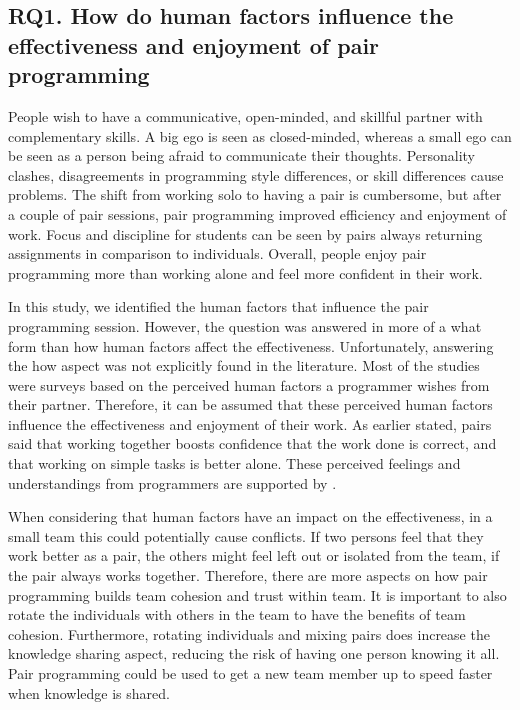 \documentclass[conference]{IEEEtran}
\begin{document}
\subsection{RQ1. How do human factors influence the effectiveness and enjoyment of pair programming}
    
People wish to have a communicative, open-minded, and skillful partner with complementary skills. A big ego is seen as closed-minded, whereas a small ego can be seen as a person being afraid to communicate their thoughts. Personality clashes, disagreements in programming style differences, or skill differences cause problems. The shift from working solo to having a pair is cumbersome, but after a couple of pair sessions, pair programming improved efficiency and enjoyment of work. Focus and discipline for students can be seen by pairs always returning assignments in comparison to individuals. Overall, people enjoy pair programming more than working alone and feel more confident in their work.

In this study, we identified the human factors that influence the pair programming session. However, the question was answered in more of a what form than how human factors affect the effectiveness. Unfortunately, answering the how aspect was not explicitly found in the literature. Most of the studies were surveys based on the perceived human factors a programmer wishes from their partner. Therefore, it can be assumed that these perceived human factors influence the effectiveness and enjoyment of their work. As earlier stated, pairs said that working together boosts confidence that the work done is correct, and that working on simple tasks is better alone. These perceived feelings and understandings from programmers are supported by \cite{Arisholm2007Evaluating}.

When considering that human factors have an impact on the effectiveness, in a small team this could potentially cause conflicts. If two persons feel that they work better as a pair, the others might feel left out or isolated from the team, if the pair always works together. Therefore, there are more aspects on how pair programming builds team cohesion and trust within team. It is important to also rotate the individuals with others in the team to have the benefits of team cohesion. Furthermore, rotating individuals and mixing pairs does increase the knowledge sharing aspect, reducing the risk of having one person knowing it all. Pair programming could be used to get a new team member up to speed faster when knowledge is shared.
\end{document}
